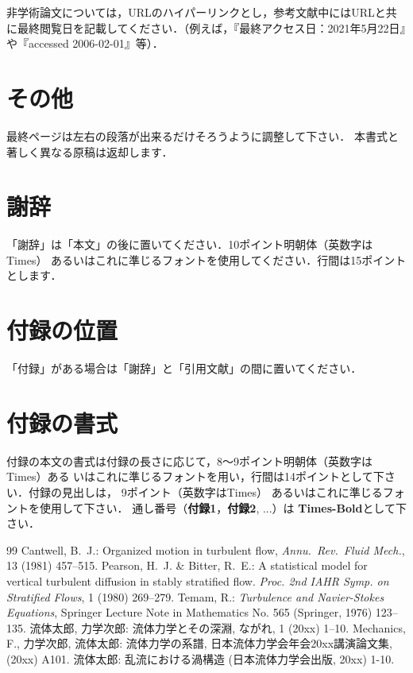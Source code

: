 \documentclass[原著論文]{nagare}
\begin{document}
非学術論文については，URLのハイパーリンクとし，参考文献中にはURLと共に最終閲覧日を記載してください．（例えば，『最終アクセス日：2021年5月22日』や『accessed 2006-02-01』等）．\\


\section{その他}

最終ページは左右の段落が出来るだけそろうように調整して下さい．
本書式と著しく異なる原稿は返却します．


\section*{謝辞}

「謝辞」は「本文」の後に置いてください．10ポイント明朝体（英数字はTimes）
あるいはこれに準じるフォントを使用してください．行間は15ポイントとします．

\appendix %
\small %

\section{付録の位置}

「付録」がある場合は「謝辞」と「引用文献」の間に置いてください．

\section{付録の書式}

付録の本文の書式は付録の長さに応じて，8〜9ポイント明朝体（英数字はTimes）ある
いはこれに準じるフォントを用い，行間は14ポイントとして下さい．付録の見出しは，
9ポイント（英数字はTimes）
あるいはこれに準じるフォントを使用して下さい．
通し番号（\textbf{付録1}，\textbf{付録2}, ...）は
\textbf{Times-Bold}として下さい． 


\begin{thebibliography}{99}
	 Cantwell, B.~J.: Organized motion in turbulent flow, 
	 \textit{Annu.~Rev.~Fluid Mech.}, 13 (1981) 457--515.
	 Pearson, H.~J. \& Bitter, R.~E.: 
	 A statistical model for 
	 vertical turbulent diffusion
	 in stably stratified flow. 
	 \textit{Proc. 2nd IAHR Symp. on Stratified Flows}, 1
	 (1980) 269--279.
	 Temam, R.: 
	 \textit{Turbulence and Navier-Stokes Equations}, 
	 Springer Lecture Note in Mathematics
	 No. 565 (Springer, 1976) 123--135.
	 流体太郎, 力学次郎: 流体力学とその深淵, ながれ, 1 (20xx) 1--10.
	 Mechanics, F., 力学次郎, 流体太郎: 流体力学の系譜, 日本流体力学会年会20xx講演論文集, (20xx) A101.
	 流体太郎: 乱流における渦構造 (日本流体力学会出版, 20xx) 1-10.
\end{thebibliography}%
\end{document}
